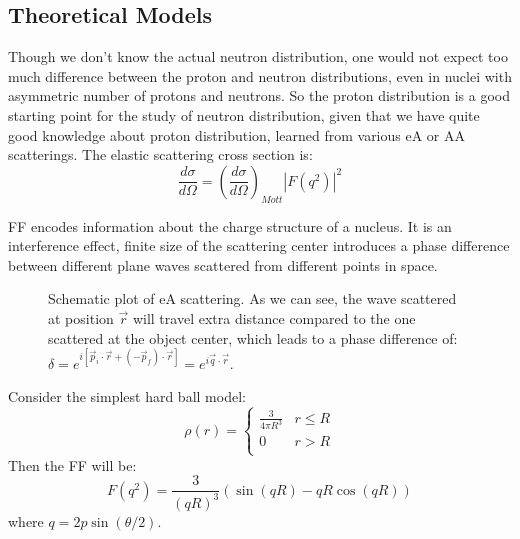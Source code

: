 \subsection{Theoretical Models} 
\label{subsec:models}
Though we don't know the actual neutron distribution, one would not expect too
much difference between the proton and neutron distributions, even in nuclei with
asymmetric number of protons and neutrons. So the proton distribution is a good
starting point for the study of neutron distribution, given that we have quite
good knowledge about proton distribution, learned from various eA or AA scatterings. 
The elastic scattering cross section is:
\begin{equation}
    \frac{d\sigma}{d\Omega} = \left( \frac{d\sigma}{d\Omega} \right)_{Mott} |F(q^2)|^2
\end{equation}

FF encodes information about the charge structure of a nucleus. It is an interference
effect, finite size of the scattering center introduces a phase difference between
different plane waves scattered from different points in space.
\begin{figure}
    \centering
    \caption{Schematic plot of eA scattering. As we can see, the wave scattered
    at position $\vec{r}$ will travel extra distance compared to the one scattered
    at the object center, which leads to a phase difference of:
    $\delta = e^{i[\vec{p}_i \cdot \vec{r} + (-\vec{p}_f) \cdot \vec{r}]} = e^{i\vec{q}\cdot\vec{r}}$.
    }
    \label{fig:FF_phase_diff}
\end{figure}

Consider the simplest hard ball model:
\begin{equation}
    \rho(r) = 
    \begin{cases}
	\frac{3}{4\pi R^3}  & r \le R	\\
	0		    & r > R   \\
    \end{cases}
    \label{eq:hard_ball_model}
\end{equation}
Then the FF will be:
\begin{equation}
    F(q^2) = \frac{3}{(qR)^3} \left( \sin(qR) - qR\cos(qR) \right)
\end{equation}
where $q = 2p\sin(\theta/2)$.

